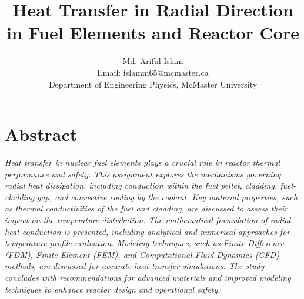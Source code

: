 \documentclass[12pt]{article}
\title{Heat Transfer in Radial Direction in Fuel Elements and Reactor Core}
\author{Md. Ariful Islam \\ Email: islamm65@mcmaster.ca \\ Department of Engineering Physics, McMaster University}
\date{}
\begin{document}
\pagestyle{fancy}
\fancyhf{}                       %
\fancyhead[R]{\today}           
\renewcommand{\headrulewidth}{0.4pt} 
\fancyfoot[C]{\thepage}

\maketitle
\thispagestyle{fancy}

\section*{\centering Abstract} 

\textit{Heat transfer in nuclear fuel elements plays a crucial role in reactor thermal performance and safety. This assignment explores the mechanisms governing radial heat dissipation, including conduction within the fuel pellet, cladding, fuel-cladding gap, and convective cooling by the coolant. Key material properties, such as thermal conductivities of the fuel and cladding, are discussed to assess their impact on the temperature distribution. The mathematical formulation of radial heat conduction is presented, including analytical and numerical approaches for temperature profile evaluation. Modeling techniques, such as Finite Difference (FDM), Finite Element (FEM), and Computational Fluid Dynamics (CFD) methods, are discussed for accurate heat transfer simulations. The study concludes with recommendations for advanced materials and improved modeling techniques to enhance reactor design and operational safety.}
\end{document}

